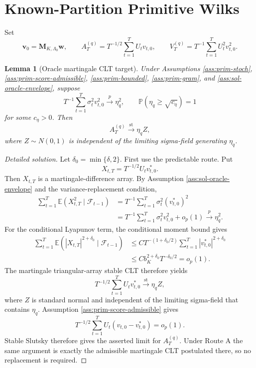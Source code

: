\documentclass[12pt]{article}
\numberwithin{equation}{section}
\newtheorem{lemma}{Lemma}
\theoremstyle{definition}
\newcommand{\E}{\mathbb E}
\newcommand{\Pp}{\mathbb P}
\begin{document}
\section{Known-Partition Primitive Wilks}

Set
\[
    \bm v_0=\bm M_{K,\Lambda_0}\bm w,
    \qquad
    A_T^{(q)}=T^{-1/2}\sum_{t=1}^TU_tv_{t,0},
    \qquad
    V_T^{(q)}=T^{-1}\sum_{t=1}^TU_t^2v_{t,0}^2.
\]

\begin{lemma}[Oracle martingale CLT target]
\label{lem:wb-oracle-clt}
Under Assumptions \ref{ass:prim-stoch}, \ref{ass:prim-score-admissible},
\ref{ass:prim-bounded}, \ref{ass:prim-gram}, and
\ref{ass:sol-oracle-envelope}, suppose
\[
    T^{-1}\sum_{t=1}^T \sigma_t^2v_{t,0}^2\xrightarrow{p}\eta_q^2,
    \qquad
    \Pp(\eta_q\geq \sqrt{c_\eta})=1
\]
for some \(c_\eta>0\). Then
\[
    A_T^{(q)}\xrightarrow{\mathrm{st}}\eta_qZ,
\]
where \(Z\sim N(0,1)\) is independent of the limiting sigma-field generating \(\eta_q\).
\end{lemma}


\begin{proof}[Detailed solution]
Let \(\delta_0=\min\{\delta,2\}\).  First use the predictable route.  Put
\[
    X_{t,T}=T^{-1/2}U_tv_{t,0}^\ast.
\]
Then \(X_{t,T}\) is a martingale-difference array.  By Assumption
\ref{ass:sol-oracle-envelope} and the variance-replacement condition,
\begin{align*}
    \sum_{t=1}^T\E(X_{t,T}^2\mid\mathcal F_{t-1})
    &=T^{-1}\sum_{t=1}^T\sigma_t^2(v_{t,0}^\ast)^2\\
    &=T^{-1}\sum_{t=1}^T\sigma_t^2v_{t,0}^2+o_p(1)
      \xrightarrow{p}\eta_q^2.
\end{align*}
For the conditional Lyapunov term, the conditional moment bound gives
\begin{align*}
    \sum_{t=1}^T
      \E(|X_{t,T}|^{2+\delta_0}\mid\mathcal F_{t-1})
    &\leq
      C T^{-(1+\delta_0/2)}
      \sum_{t=1}^T|v_{t,0}^\ast|^{2+\delta_0}\\
    &\leq
      C b_K^{2+\delta_0}T^{-\delta_0/2}
      =o_p(1).
\end{align*}
The martingale triangular-array stable CLT therefore yields
\[
    T^{-1/2}\sum_{t=1}^TU_tv_{t,0}^\ast
    \xrightarrow{\mathrm{st}}\eta_qZ,
\]
where \(Z\) is standard normal and independent of the limiting sigma-field
that contains \(\eta_q\).  Assumption \ref{ass:prim-score-admissible} gives
\[
    T^{-1/2}\sum_{t=1}^TU_t(v_{t,0}-v_{t,0}^\ast)=o_p(1).
\]
Stable Slutsky therefore gives the asserted limit for \(A_T^{(q)}\).  Under
Route A the same argument is exactly the admissible martingale CLT postulated
there, so no replacement is required.
\end{proof}
\end{document}
